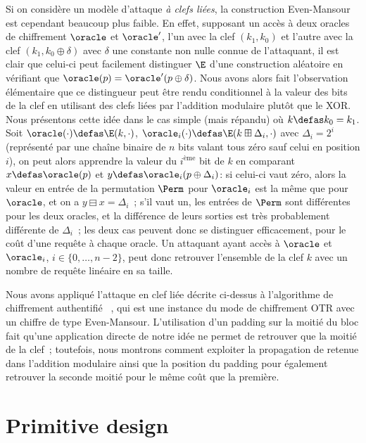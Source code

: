 Si on considère un modèle d'attaque \emph{à clefs liées}, la construction Even-Mansour est cependant beaucoup plus faible. En effet, supposant un accès à deux oracles de chiffrement
$\oracle$ et $\oracle'$, l'un avec la clef $(k_1,k_0)$ et l'autre avec la clef $(k_1,k_0\oplus\delta)$ avec $\delta$ une constante non nulle connue de l'attaquant,
il est clair que celui-ci peut facilement distinguer $\E$ d'une construction aléatoire en vérifiant que $\oracle(p) = \oracle'(p \oplus \delta)$.
Nous avons alors fait l'observation élémentaire que ce distingueur peut être rendu conditionnel à la valeur des bits de la clef en utilisant des clefs liées par l'addition
modulaire plutôt que le XOR. Nous présentons cette idée dans le cas simple (mais répandu) où $k \defas k_0 = k_1$. Soit $\oracle(\cdot) \defas \E(k, \cdot)$, $\oracle_i(\cdot)
\defas \E(k \boxplus \Delta_i,\cdot)$ avec $\Delta_i = 2^i$ (représenté par une chaîne binaire de $n$ bits valant tous zéro sauf celui en position $i$), on peut alors
apprendre la valeur du $i^\text{ème}$ bit de $k$ en comparant $x \defas \oracle(p)$ et $y \defas \oracle_i(p \oplus \Delta_i)$: si celui-ci vaut zéro, alors la valeur
en entrée de la permutation $\Perm$ pour $\oracle_i$ est la même que pour $\oracle$, et on a $y \boxminus x = \Delta_i$~; s'il vaut un, les entrées de $\Perm$ sont différentes
pour les deux oracles, et la différence de leurs sorties est très probablement différente de $\Delta_i$~; les deux cas peuvent donc se distinguer efficacement, pour le coût
d'une requête à chaque oracle. Un attaquant ayant accès à $\oracle$ et $\oracle_i$, $i \in \{0,\ldots,n - 2\}$, peut donc retrouver l'ensemble de la clef $k$ 
avec un nombre de requête linéaire en sa taille. 

Nous avons appliqué l'attaque en clef liée décrite ci-dessus à l'algorithme de chiffrement authentifié \proestotr~\cite{proest}, qui est une instance du mode de chiffrement
OTR avec un chiffre de type Even-Mansour.  L'utilisation d'un padding sur la moitié du bloc fait qu'une application directe de notre idée ne permet de retrouver que la moitié
de la clef~; toutefois, nous montrons comment exploiter la propagation de retenue dans l'addition modulaire ainsi que la position du padding pour également retrouver la seconde moitié pour le même coût que la première.

\section[Conception de primitives]{Primitive design}

